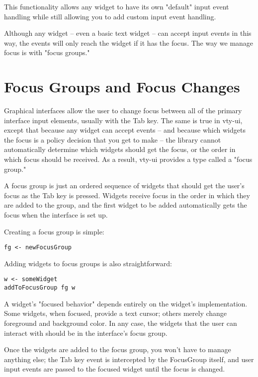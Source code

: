 \documentclass[11pt, letterpaper, oneside, titlepage]{article}
\begin{document}
This functionality allows any widget to have its own "default" input
event handling while still allowing you to add custom input event
handling.

Although any widget -- even a basic text widget -- can accept input
events in this way, the events will only reach the widget if it has the
focus.  The way we manage focus is with "focus groups."

\section{Focus Groups and Focus Changes}

Graphical interfaces allow the user to change focus between all of the
primary interface input elements, usually with the Tab key.  The same is
true in vty-ui, except that because any widget can accept events -- and
because which widgets the focus is a policy decision that you get to
make -- the library cannot automatically determine which widgets should
get the focus, or the order in which focus should be received.  As a
result, vty-ui provides a type called a "focus group."

A focus group is just an ordered sequence of widgets that should get the
user's focus as the Tab key is pressed.  Widgets receive focus in the
order in which they are added to the group, and the first widget to be
added automatically gets the focus when the interface is set up.

Creating a focus group is simple:

\begin{verbatim}
fg <- newFocusGroup
\end{verbatim}

Adding widgets to focus groups is also straightforward:

\begin{verbatim}
w <- someWidget
addToFocusGroup fg w
\end{verbatim}

A widget's "focused behavior" depends entirely on the widget's
implementation.  Some widgets, when focused, provide a text cursor;
others merely change foreground and background color.  In any case, the
widgets that the user can interact with should be in the interface's
focus group.

Once the widgets are added to the focus group, you won't have to manage
anything else; the Tab key event is intercepted by the FocusGroup
itself, and user input events are passed to the focused widget until the
focus is changed.
\end{document}
